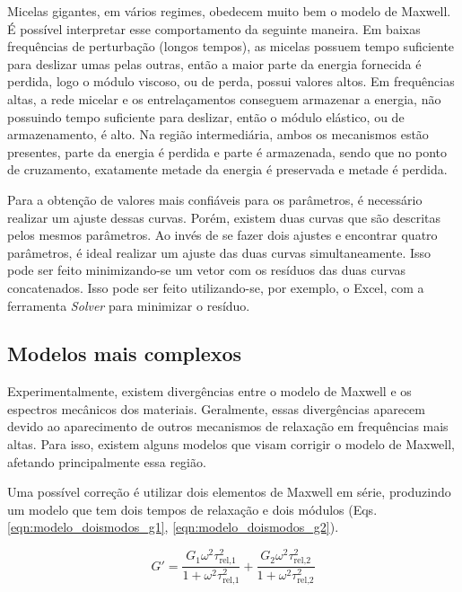 			Micelas gigantes, em vários regimes, obedecem muito bem o modelo de Maxwell. É possível interpretar esse comportamento da seguinte maneira. Em baixas frequências de perturbação (longos tempos), as micelas possuem tempo suficiente para deslizar umas pelas outras, então a maior parte da energia fornecida é perdida, logo o módulo viscoso, ou de perda, possui valores altos. Em frequências altas, a rede micelar e os entrelaçamentos conseguem armazenar a energia, não possuindo tempo suficiente para deslizar, então o módulo elástico, ou de armazenamento, é alto. Na região intermediária, ambos os mecanismos estão presentes, parte da energia é perdida e parte é armazenada, sendo que no ponto de cruzamento, exatamente metade da energia é preservada e metade é perdida.
			
			Para a obtenção de valores mais confiáveis para os parâmetros, é necessário realizar um ajuste dessas curvas. Porém, existem duas curvas que são descritas pelos mesmos parâmetros. Ao invés de se fazer dois ajustes e encontrar quatro parâmetros, é ideal realizar um ajuste das duas curvas simultaneamente. Isso pode ser feito minimizando-se um vetor com os resíduos das duas curvas concatenados. Isso pode ser feito utilizando-se, por exemplo, o Excel, com a ferramenta \emph{Solver} para minimizar o resíduo.
			
			\subsection{Modelos mais complexos}
			
			Experimentalmente, existem divergências entre o modelo de Maxwell e os espectros mecânicos dos materiais. Geralmente, essas divergências aparecem devido ao aparecimento de outros  mecanismos de relaxação em frequências mais altas. Para isso, existem alguns modelos que visam corrigir o modelo de Maxwell, afetando principalmente essa região.
			
			Uma possível correção é utilizar dois elementos de Maxwell em série, produzindo um modelo que tem dois tempos de relaxação e dois módulos (Eqs. \ref{eqn:modelo_doismodos_g1}, \ref{eqn:modelo_doismodos_g2}).
			
			\begin{equation}
				G' = \dfrac{ G_1 \omega^2 \tau_{\textrm{rel,1}}^2   }{  1 + \omega^2 \tau_{\textrm{rel,1}}^2      } + \dfrac{ G_2 \omega^2 \tau_{\textrm{rel,2}}^2   }{  1 + \omega^2 \tau_{\textrm{rel,2}}^2      }
			\label{eqn:modelo_doismodos_g1}
			\end{equation}
		
